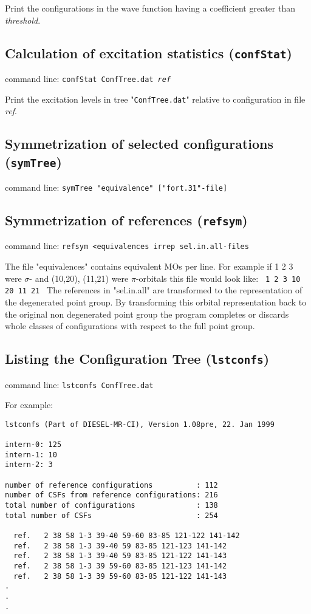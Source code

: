 Print the configurations in the wave function having a coefficient
greater than {\it threshold}.


\subsection{Calculation of excitation statistics ({\tt confStat})}
\bigskip

command line:
{\tt confStat ConfTree.dat {\it ref} }

Print the excitation levels in tree "{\tt ConfTree.dat}" relative
to configuration in file {\it ref}.


\subsection{Symmetrization of selected configurations ({\tt symTree})}
\bigskip

command line:
{\tt symTree "equivalence" ["fort.31"-file]  }

\subsection{Symmetrization of references ({\tt refsym})}

command line:
{\tt refsym <equivalences irrep sel.in.all-files}

The file "equivalences" contains equivalent MOs per line. For example if
1 2 3 were $\sigma$- and (10,20), (11,21) were $\pi$-orbitals this
file would look like:
{\obeylines
{\tt
1
2
3
10 20
11 21
}}
The references in "sel.in.all" are transformed to the representation
of the degenerated point group. By transforming this orbital representation
back to the original non degenerated point group the program completes
or discards whole classes of configurations with respect to the full
point group. 

\subsection{Listing the Configuration Tree ({\tt lstconfs})}
\bigskip

command line:
{\tt lstconfs ConfTree.dat}

For example:
\begin{verbatim}
lstconfs (Part of DIESEL-MR-CI), Version 1.08pre, 22. Jan 1999

intern-0: 125
intern-1: 10
intern-2: 3

number of reference configurations          : 112
number of CSFs from reference configurations: 216
total number of configurations              : 138
total number of CSFs                        : 254

  ref.   2 38 58 1-3 39-40 59-60 83-85 121-122 141-142
  ref.   2 38 58 1-3 39-40 59 83-85 121-123 141-142
  ref.   2 38 58 1-3 39-40 59 83-85 121-122 141-143
  ref.   2 38 58 1-3 39 59-60 83-85 121-123 141-142
  ref.   2 38 58 1-3 39 59-60 83-85 121-122 141-143
.
.
.
\end{verbatim}

